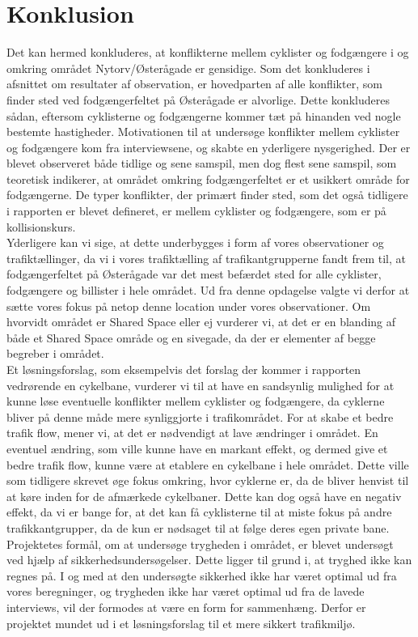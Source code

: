 \chapter{Konklusion}
\label{chap:konklusion}
Det kan hermed konkluderes, at konflikterne mellem cyklister og fodgængere i og omkring området Nytorv/Østerågade er gensidige. Som det konkluderes i afsnittet om resultater af observation, er hovedparten af alle konflikter, som finder sted ved fodgængerfeltet på Østerågade er alvorlige. Dette konkluderes sådan, eftersom cyklisterne og fodgængerne kommer tæt på hinanden ved nogle bestemte hastigheder. Motivationen til at undersøge konflikter mellem cyklister og fodgængere kom fra interviewsene, og skabte en yderligere nysgerighed. Der er blevet observeret både tidlige og sene samspil, men dog flest sene samspil, som teoretisk indikerer, at området omkring fodgængerfeltet er et usikkert område for fodgængerne. De typer konflikter, der primært finder sted, som det også tidligere i rapporten er blevet defineret, er mellem cyklister og fodgængere, som er på kollisionskurs.~\\
 Yderligere kan vi sige, at dette underbygges i form af vores observationer og trafiktællinger, da vi i vores trafiktælling af trafikantgrupperne fandt frem til, at fodgængerfeltet på Østerågade var det mest befærdet sted for alle cyklister, fodgængere og billister i hele området. Ud fra denne opdagelse valgte vi derfor at sætte vores fokus på netop denne location under vores observationer. Om hvorvidt området er Shared Space eller ej vurderer vi, at det er en blanding af både et Shared Space område og en sivegade, da der er elementer af begge begreber i området.~\\
 Et løsningsforslag, som eksempelvis det forslag der kommer i rapporten vedrørende en cykelbane, vurderer vi til at have en sandsynlig mulighed for at kunne løse eventuelle konflikter mellem cyklister og fodgængere, da cyklerne bliver på denne måde mere synliggjorte i trafikområdet. For at skabe et bedre trafik flow, mener vi, at det er nødvendigt at lave ændringer i området. En eventuel ændring, som ville kunne have en markant effekt, og dermed give et bedre trafik flow, kunne være at etablere en cykelbane i hele området. Dette ville som tidligere skrevet øge fokus omkring, hvor cyklerne er, da de bliver henvist til at køre inden for de afmærkede cykelbaner. Dette kan dog også have en negativ effekt, da vi er bange for, at det kan få cyklisterne til at miste fokus på andre trafikkantgrupper, da de kun er nødsaget til at følge deres egen private bane.
 Projektetes formål, om at undersøge trygheden i området, er blevet undersøgt ved hjælp af sikkerhedsundersøgelser. Dette ligger til grund i, at tryghed ikke kan regnes på. I og med at den undersøgte sikkerhed ikke har været optimal ud fra vores beregninger, og trygheden ikke har været optimal ud fra de lavede interviews, vil der formodes at være en form for sammenhæng. Derfor er projektet mundet ud i et løsningsforslag til et mere sikkert trafikmiljø.
